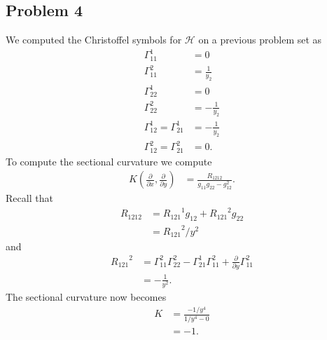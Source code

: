 \documentclass{../mathnotes}
\begin{document}
\subsection*{Problem 4}
We computed the Christoffel symbols for $\mathcal{H}$ on a previous problem
set as
\begin{align*}
    \Gamma_{11}^1 &= 0\\
    \Gamma_{11}^2 &= \frac{1}{y_2}\\
    \Gamma_{22}^1 &= 0\\
    \Gamma_{22}^2 &= -\frac{1}{y_2}\\
    \Gamma_{12}^1 = \Gamma_{21}^1 &= -\frac{1}{y_2}\\
    \Gamma_{12}^2 =\Gamma_{21}^2 &= 0.
\end{align*}
To compute the sectional curvature we compute
\begin{align*}
    K\left(\frac{\partial}{\partial x},\frac{\partial}{\partial y}\right) &= \frac{R_{1212}}{g_{11}g_{22}-g_{12}^2}.
\end{align*}
Recall that
\begin{align*}
    R_{1212} &= {R_{121}}^1g_{12}+{R_{121}}^2g_{22}\\
    &= {R_{121}}^2/y^2
\end{align*}
and
\begin{align*}
    {R_{121}}^2 &= \Gamma_{11}^2\Gamma_{22}^2-\Gamma_{21}^1\Gamma_{11}^2+\frac{\partial}{\partial y}\Gamma_{11}^2\\
    &= -\frac{1}{y^2}.
\end{align*}
The sectional curvature now becomes
\begin{align*}
    K &= \frac{-1/y^4}{1/y^4-0}\\
    &= -1.
\end{align*}
\end{document}
